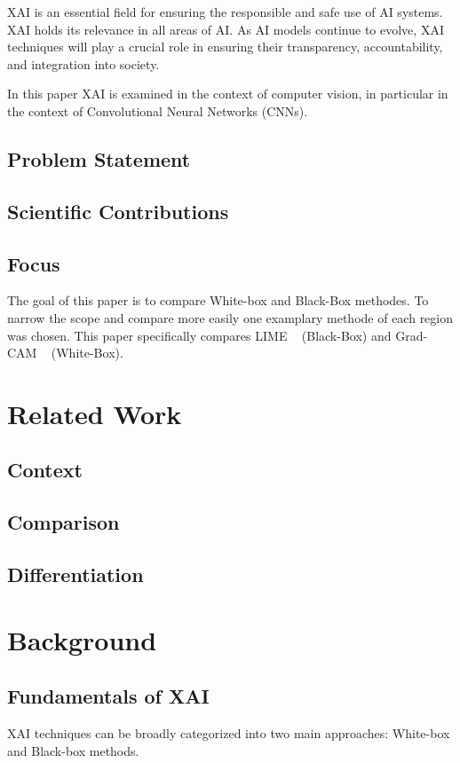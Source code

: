 \documentclass{article}
\begin{document}
XAI is an essential field for ensuring the responsible and safe use of AI systems. XAI holds its relevance in all areas of AI. As AI models continue to evolve, XAI techniques will play a crucial role in ensuring their transparency, accountability, and integration into society.

In this paper XAI is examined in the context of computer vision, in particular in the context of Convolutional Neural Networks (CNNs). 

\subsection{Problem Statement}
\subsection{Scientific Contributions}

\subsection{Focus}
The goal of this paper is to compare White-box and Black-Box methodes. To narrow the scope and compare more easily one examplary methode of each region was chosen. This paper specifically compares LIME ~\cite{ribeiro2016why} (Black-Box) and Grad-CAM ~\cite{Selvaraju_2019} (White-Box).


\section{Related Work}
\subsection{Context}
\subsection{Comparison}
\subsection{Differentiation}

\section{Background}

\subsection{Fundamentals of XAI}
XAI techniques can be broadly categorized into two main approaches: White-box and Black-box methods.
\end{document}
